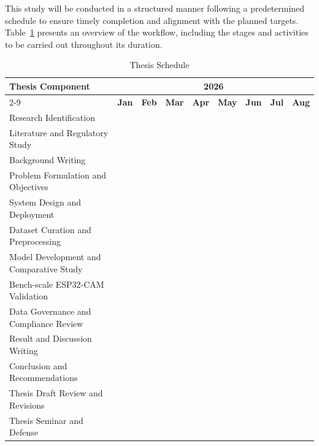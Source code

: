 This study will be conducted in a structured manner following a predetermined schedule to ensure timely completion and alignment with the planned targets. Table~\ref{tab:tabel1-1} presents an overview of the workflow, including the stages and activities to be carried out throughout its duration.

\begin{table}[h]
    \centering
    \caption{Thesis Schedule}
    \label{tab:tabel1-1}
    \small
    \setlength{\tabcolsep}{4pt}
    \renewcommand{\arraystretch}{1.2}
    \begin{tabular}{|p{5.3cm}|c|c|c|c|c|c|c|c|}
        \hline
        \multirow{2}{*}{\textbf{Thesis Component}} & \multicolumn{8}{c|}{\textbf{2026}} \\
        \cline{2-9}
         & \textbf{Jan} & \textbf{Feb} & \textbf{Mar} & \textbf{Apr} & \textbf{May} & \textbf{Jun} & \textbf{Jul} & \textbf{Aug} \\
        \hline
        Research Identification & \cellcolor{green!30} & \cellcolor{green!30} & & & & & & \\
        \hline
        Literature and Regulatory Study & \cellcolor{green!30} & \cellcolor{green!30} & \cellcolor{green!30} & \cellcolor{green!30} & & & & \\
        \hline
        Background Writing & & \cellcolor{green!30} & \cellcolor{green!30} & & & & & \\
        \hline
        Problem Formulation and Objectives & & \cellcolor{green!30} & \cellcolor{green!30} & & & & & \\
        \hline
        System Design and Deployment & & & \cellcolor{green!30} & \cellcolor{green!30} & \cellcolor{green!30} & & & \\
        \hline
        Dataset Curation and Preprocessing & & & \cellcolor{green!30} & \cellcolor{green!30} & & & & \\
        \hline
        Model Development and Comparative Study & & & & \cellcolor{green!30} & \cellcolor{green!30} & \cellcolor{green!30} & & \\
        \hline
        Bench-scale ESP32-CAM Validation & & & & & & \cellcolor{green!30} & \cellcolor{green!30} & \\
        \hline
        Data Governance and Compliance Review & & & & & \cellcolor{green!30} & \cellcolor{green!30} & & \\
        \hline
        Result and Discussion Writing & & & & & \cellcolor{green!30} & \cellcolor{green!30} & \cellcolor{green!30} & \\
        \hline
        Conclusion and Recommendations & & & & & & & \cellcolor{green!30} & \cellcolor{green!30} \\
        \hline
        Thesis Draft Review and Revisions & & & & & & & \cellcolor{green!30} & \cellcolor{green!30} \\
        \hline
        Thesis Seminar and Defense & & & & & & & & \cellcolor{green!30} \\
        \hline
    \end{tabular}
\end{table}

